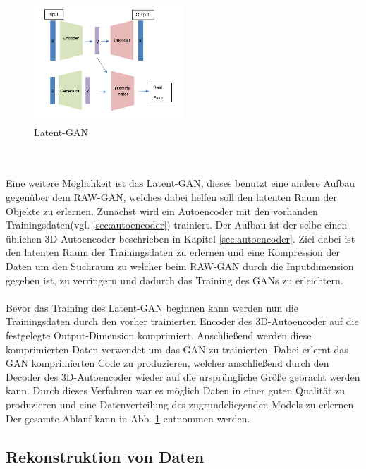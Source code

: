 \documentclass{llncs}
\begin{document}
\begin{figure}[htbp] 
	\centering
	\includegraphics[width=0.5\textwidth]{latentgan.png}
	\caption{Latent-GAN}
	\label{fig:Bild39}
\end{figure}
~\\\\
Eine weitere Möglichkeit ist das Latent-GAN, dieses benutzt eine andere Aufbau gegenüber dem RAW-GAN, welches dabei helfen soll den latenten Raum der Objekte zu erlernen. Zunächst wird ein Autoencoder mit den vorhanden Trainingsdaten(vgl. \ref{sec:autoencoder}) trainiert. Der Aufbau ist der selbe einen üblichen 3D-Autoencoder beschrieben in Kapitel \ref{sec:autoencoder}. Ziel dabei ist den latenten Raum der Trainingsdaten zu erlernen und eine Kompression der Daten um den Suchraum zu  welcher beim RAW-GAN durch die Inputdimension gegeben ist, zu verringern und dadurch das Training des GANs zu erleichtern\cite{3dgan}. 
\\\\
Bevor das Training des Latent-GAN beginnen kann werden nun die Trainingsdaten durch den vorher trainierten Encoder des 3D-Autoencoder auf die festgelegte Output-Dimension komprimiert. Anschließend werden diese komprimierten Daten verwendet um das GAN zu trainierten. Dabei erlernt das GAN komprimierten Code zu produzieren, welcher anschließend durch den Decoder des 3D-Autoencoder wieder auf die ursprüngliche Größe gebracht werden kann. Durch dieses Verfahren war es möglich Daten in einer guten Qualität zu produzieren und eine Datenverteilung des zugrundeliegenden Models zu erlernen. Der gesamte Ablauf kann in Abb. \ref{fig:Bild39} entnommen werden\cite{3dgan}. 

\subsection{Rekonstruktion von Daten}\label{sec:rekdaten}
\end{document}
